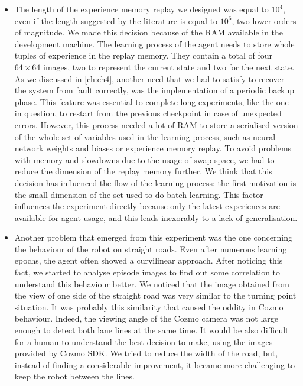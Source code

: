 \begin{itemize}
    \item The length of the experience memory replay we designed was equal to $10^4$, even if the length suggested by the literature is equal to $10^6$, two lower orders of magnitude.
          We made this decision because of the RAM available in the development machine.
          The learning process of the agent needs to store whole tuples of experience in the replay memory.
          They contain a total of four $64 \times 64$ images, two to represent the current state and two for the next state.
          As we discussed in \vref{ch:ch4}, another need that we had to satisfy to recover the system from fault correctly, was the implementation of a periodic backup phase.
          This feature was essential to complete long experiments, like the one in question, to restart from the previous checkpoint in case of unexpected errors.
          However, this process needed a lot of RAM to store a serialised version of the whole set of variables used in the learning process, such as neural network weights and biases or experience memory replay.
          To avoid problems with memory and slowdowns due to the usage of swap space, we had to reduce the dimension of the replay memory further.
          We think that this decision has influenced the flow of the learning process: the first motivation is the small dimension of the set used to do batch learning.
          This factor influences the experiment directly because only the latest experiences are available for agent usage, and this leads inexorably to a lack of generalisation.
    \item Another problem that emerged from this experiment was the one concerning the behaviour of the robot on straight roads.
          Even after numerous learning epochs, the agent often showed a curvilinear approach.
          After noticing this fact, we started to analyse episode images to find out some correlation to understand this behaviour better.
          We noticed that the image obtained from the view of one side of the straight road was very similar to the turning point situation.
          It was probably this similarity that caused the oddity in Cozmo behaviour.
          Indeed, the viewing angle of the Cozmo camera was not large enough to detect both lane lines at the same time.
          It would be also difficult for a human to understand the best decision to make, using the images provided by Cozmo SDK.
          We tried to reduce the width of the road, but, instead of finding a considerable improvement, it became more challenging to keep the robot between the lines.

\end{itemize}
